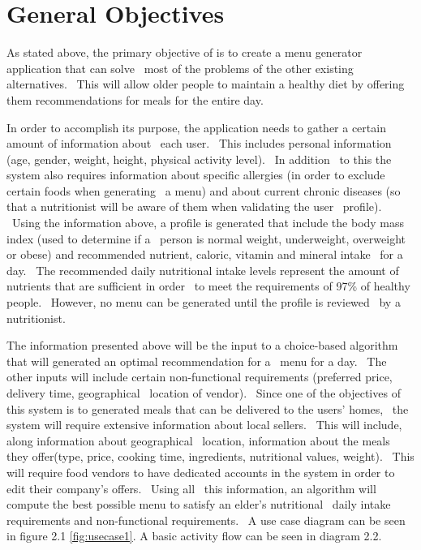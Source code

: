 \section{General Objectives}
\label{sec:specification-objectives}
As stated above, the primary objective of \applicationTitle{} is to create a menu generator application that can solve \
most of the problems of the other existing alternatives. \
This will allow older people to maintain a healthy diet by offering them recommendations for meals for the entire day.

In order to accomplish its purpose, the application needs to gather a certain amount of information about \
each user. \
This includes personal information (age, gender, weight, height, physical activity level). \
In addition \
to this the system also requires information about specific allergies (in order to exclude certain foods when generating \
a menu) and about current chronic diseases (so that a nutritionist will be aware of them when validating the user \
profile). \
Using the information above, a profile is generated that include the body mass index (used to determine if a \
person is normal weight, underweight, overweight or obese) and recommended nutrient, caloric, vitamin and mineral intake \
for a day. \
The recommended daily nutritional intake levels represent the amount of nutrients that are sufficient in order \
to meet the requirements of 97\% of healthy people. \
However, no menu can be generated until the profile is reviewed \
by a nutritionist.

The information presented above will be the input to a choice-based algorithm that will generated an optimal recommendation for a \
menu for a day. \
The other inputs will include certain non-functional requirements (preferred price, delivery time, geographical \
location of vendor). \
Since one of the objectives of this system is to generated meals that can be delivered to the users' homes, \
the system will require extensive information about local sellers. \
This will include, along information about geographical \
location, information about the meals they offer(type, price, cooking time, ingredients, nutritional values, weight). \
This will require food vendors to have dedicated accounts in the system in order to edit their company's offers. \
Using all \
this information, an algorithm will compute the best possible menu to satisfy an elder's nutritional \
daily intake requirements and non-functional requirements. \
A use case diagram can be seen in figure 2.1 \ref{fig:usecase1}.
A basic activity flow can be seen in diagram 2.2.

